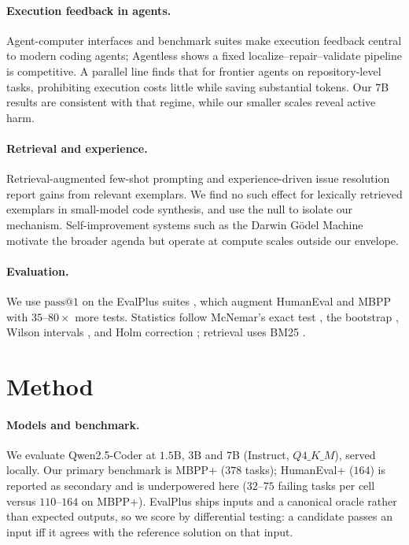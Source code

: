 \documentclass{article}
\makeatletter
\newcommand{\pass}{\mathrm{pass}@1}
\makeatother
\begin{document}
\paragraph{Execution feedback in agents.}
Agent-computer interfaces \citep{yang2024sweagent} and benchmark suites
\citep{jimenez2024swebench} make execution feedback central to modern coding
agents; Agentless \citep{xia2024agentless} shows a fixed
localize--repair--validate pipeline is competitive. A parallel line finds that
for frontier agents on repository-level tasks, prohibiting execution costs
little while saving substantial tokens. Our $7$B results are consistent with
that regime, while our smaller scales reveal active harm.

\paragraph{Retrieval and experience.}
Retrieval-augmented few-shot prompting \citep{liu2024rag4code} and
experience-driven issue resolution \citep{zhang2024codagentexp} report gains
from relevant exemplars. We find no such effect for lexically retrieved
exemplars in small-model code synthesis, and use the null to isolate our
mechanism. Self-improvement systems such as the Darwin G{\"o}del Machine
\citep{zhang2025dgm} motivate the broader agenda but operate at compute scales
outside our envelope.

\paragraph{Evaluation.}
We use $\pass$ \citep{chen2021codex} on the EvalPlus suites
\citep{liu2023evalplus}, which augment HumanEval \citep{chen2021codex} and MBPP
\citep{austin2021mbpp} with $35$--$80\times$ more tests. Statistics follow
McNemar's exact test \citep{mcnemar1947}, the bootstrap
\citep{efron1979bootstrap}, Wilson intervals \citep{wilson1927}, and Holm
correction \citep{holm1979}; retrieval uses BM25 \citep{robertson2009bm25}.

\section{Method}
\label{sec:method}

\paragraph{Models and benchmark.}
We evaluate Qwen2.5-Coder \citep{hui2024qwencoder} at $1.5$B, $3$B and $7$B
(Instruct, $Q4\_K\_M$), served locally. Our primary benchmark is MBPP+
($378$ tasks); HumanEval+ ($164$) is reported as secondary and is underpowered
here ($32$--$75$ failing tasks per cell versus $110$--$164$ on MBPP+). EvalPlus
ships inputs and a canonical oracle rather than expected outputs, so we score
by differential testing: a candidate passes an input iff it agrees with the
reference solution on that input.
\end{document}
